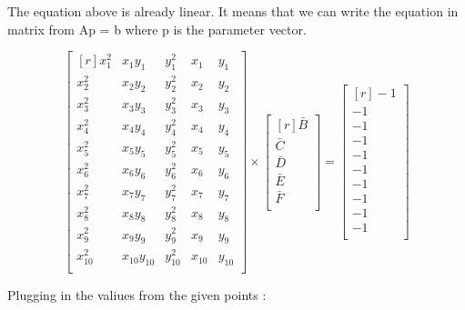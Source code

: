 \documentclass[a4paper]{article}
\begin{document}
The equation above is already linear. It means that we can write the equation in matrix from Ap = b where p is the parameter vector.

			$$\begin{bmatrix}[r]
				x_{1}^{2} & x_{1}y_{1} &y_{1}^2 & x_{1} & y_{1}\\
				x_{2}^{2} & x_{2}y_{2} &y_{2}^2 & x_{2} & y_{2}\\
				x_{3}^{2} & x_{3}y_{3} &y_{3}^2 & x_{3} & y_{3}\\
				x_{4}^{2} & x_{4}y_{4} &y_{4}^2 & x_{4} & y_{4}\\
				x_{5}^{2} & x_{5}y_{5} &y_{5}^2 & x_{5} & y_{5}\\
				x_{6}^{2} & x_{6}y_{6} &y_{6}^2 & x_{6} & y_{6}\\
				x_{7}^{2} & x_{7}y_{7} &y_{7}^2 & x_{7} & y_{7}\\
				x_{8}^{2} & x_{8}y_{8} &y_{8}^2 & x_{8} & y_{8}\\
				x_{9}^{2} & x_{9}y_{9} &y_{9}^2 & x_{9} & y_{9}\\
				x_{10}^{2} & x_{10}y_{10} &y_{10}^2 & x_{10} & y_{10}\\

			\end{bmatrix} \times \begin{bmatrix}[r]
				\bar{B}\\
				\bar{C}\\
				\bar{D}\\
				\bar{E}\\
				\bar{F}\\
			\end{bmatrix} = \begin{bmatrix}[r]
					-1\\
					-1\\
					-1\\
					-1\\
					-1\\
					-1\\
					-1\\
					-1\\
					-1\\
					-1\\
			\end{bmatrix}$$

Plugging in the valiues from the given points : 
\end{document}
